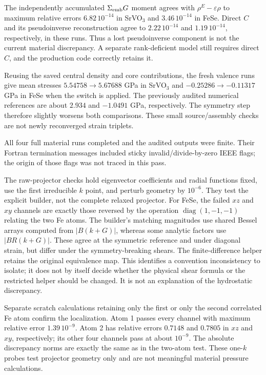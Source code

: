 \documentclass[11pt]{article}
\begin{document}
The independently accumulated $\Sigma_{\rm emb}G$ moment agrees with
$\rho^E-\varepsilon\rho$ to maximum relative errors $6.82\,10^{-14}$ in
SrVO$_3$ and $3.46\,10^{-14}$ in FeSe. Direct $C$ and its pseudoinverse
reconstruction agree to $2.22\,10^{-14}$ and $1.19\,10^{-14}$, respectively,
in these runs. Thus a lost pseudoinverse component is not the current
material discrepancy. A separate rank-deficient model still requires direct
$C$, and the production code correctly retains it.

Reusing the saved central density and core contributions, the fresh valence
runs give mean stresses $5.54758\to5.67688$ GPa in SrVO$_3$ and
$-0.25286\to-0.11317$ GPa in FeSe when the switch is applied. The previously
audited numerical references are about $2.934$ and $-1.0491$ GPa,
respectively. The symmetry step therefore slightly worsens both comparisons.
These small source/assembly checks are not newly reconverged strain triplets.

All four full material runs completed and the audited outputs were finite.
Their Fortran termination messages included sticky invalid/divide-by-zero
IEEE flags; the origin of those flags was not traced in this pass.

The raw-projector checks hold eigenvector coefficients and radial functions
fixed, use the first irreducible $k$ point, and perturb geometry by $10^{-6}$.
They test the explicit builder, not the complete relaxed projector. For FeSe,
the failed $xz$ and $xy$ channels are exactly those reversed by the operation
$\operatorname{diag}(1,-1,-1)$ relating the two Fe atoms. The builder's
matching magnitudes use shared Bessel arrays computed from $|B(k+G)|$,
whereas some analytic factors use $|B R(k+G)|$. These agree at the symmetric
reference and under diagonal strain, but differ under the symmetry-breaking
shears. The finite-difference helper retains the original equivalence map.
This identifies a convention inconsistency to isolate; it does not by itself
decide whether the physical shear formula or the restricted helper should be
changed. It is not an explanation of the hydrostatic discrepancy.

Separate scratch calculations retaining only the first or only the second
correlated Fe atom confirm the localization. Atom 1 passes every channel
with maximum relative error $1.39\,10^{-9}$. Atom 2 has relative errors
$0.7148$ and $0.7805$ in $xz$ and $xy$, respectively; its other four channels
pass at about $10^{-9}$. The absolute discrepancy norms are exactly the
same as in the two-atom test. These one-$k$ probes test projector geometry
only and are not meaningful material pressure calculations.
\end{document}
